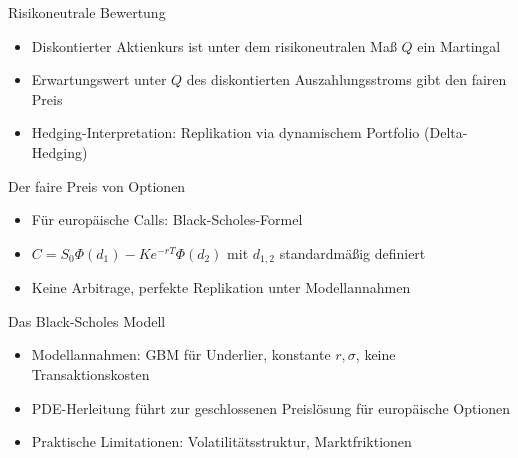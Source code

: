 \documentclass{beamer}
\begin{document}
\begin{frame}{Risikoneutrale Bewertung}
  \begin{itemize}
      \item Diskontierter Aktienkurs ist unter dem risikoneutralen Maß $Q$ ein Martingal
      \item Erwartungswert unter $Q$ des diskontierten Auszahlungsstroms gibt den fairen Preis
      \item Hedging-Interpretation: Replikation via dynamischem Portfolio (Delta-Hedging)
  \end{itemize}
\end{frame}

\begin{frame}{Der faire Preis von Optionen}
  \begin{itemize}
      \item Für europäische Calls: Black-Scholes-Formel
      \item $C = S_0\Phi(d_1) - Ke^{-rT}\Phi(d_2)$ mit $d_{1,2}$ standardmäßig definiert
      \item Keine Arbitrage, perfekte Replikation unter Modellannahmen
  \end{itemize}
\end{frame}

\begin{frame}{Das Black-Scholes Modell}
  \begin{itemize}
      \item Modellannahmen: GBM für Underlier, konstante $r,\sigma$, keine Transaktionskosten
      \item PDE-Herleitung führt zur geschlossenen Preislösung für europäische Optionen
      \item Praktische Limitationen: Volatilitätsstruktur, Marktfriktionen
  \end{itemize}
\end{frame}
\end{document}
